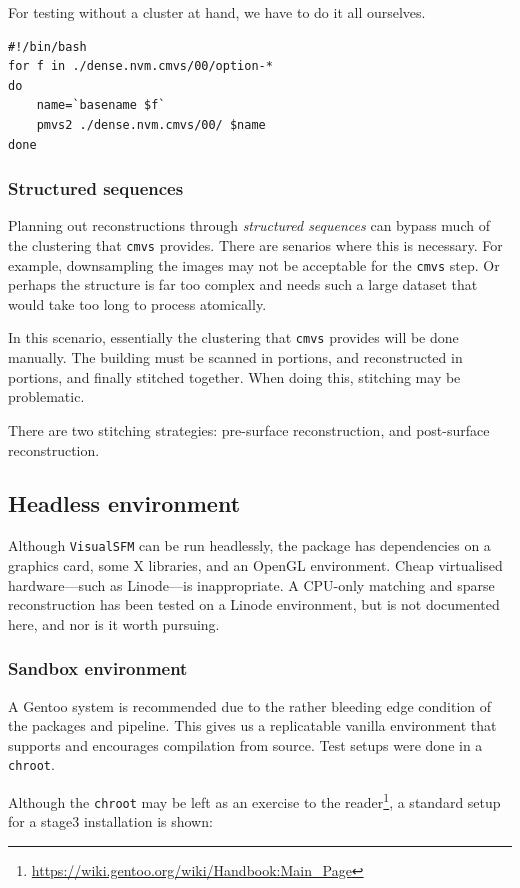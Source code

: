 \documentclass{article}
\begin{document}
For testing without a cluster at hand, we have to do it all ourselves.

\begin{lstlisting}
#!/bin/bash
for f in ./dense.nvm.cmvs/00/option-*
do
    name=`basename $f`
    pmvs2 ./dense.nvm.cmvs/00/ $name
done
\end{lstlisting}

\subsubsection{Structured sequences}

Planning out reconstructions through \emph{structured sequences} can bypass much of the clustering that {\tt cmvs} provides. There are senarios where this is necessary. For example, downsampling the images may not be acceptable for the {\tt cmvs} step. Or perhaps the structure is far too complex and needs such a large dataset that would take too long to process atomically.

In this scenario, essentially the clustering that {\tt cmvs} provides will be done manually. The building must be scanned in portions, and reconstructed in portions, and finally stitched together. When doing this, stitching may be problematic.

There are two stitching strategies: pre-surface reconstruction, and post-surface reconstruction.

\subsection{Headless environment}
Although {\tt VisualSFM} can be run headlessly, the package has dependencies on a graphics card, some X libraries, and an OpenGL environment. Cheap virtualised hardware---such as Linode---is inappropriate. A CPU-only matching and sparse reconstruction has been tested on a Linode environment, but is not documented here, and nor is it worth pursuing.
\subsubsection{Sandbox environment}
A Gentoo system is recommended due to the rather bleeding edge condition of the packages and pipeline. This gives us a replicatable vanilla environment that supports and encourages compilation from source. Test setups were done in a {\tt chroot}.

Although the {\tt chroot} may be left as an exercise to the reader\footnote{\url{https://wiki.gentoo.org/wiki/Handbook:Main\_Page}}, a standard setup for a stage3 installation is shown:
\end{document}
